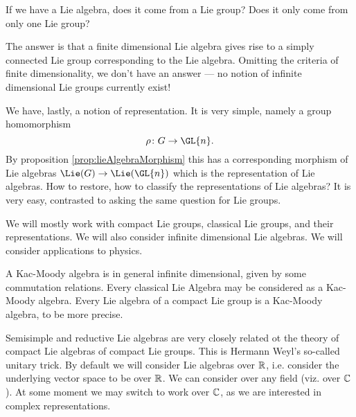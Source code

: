 \begin{quest}
If we have a Lie algebra, does it come from a Lie group? Does it
only come from only one Lie group?
\end{quest}
The answer is that a finite dimensional Lie algebra gives rise to
a simply connected Lie group corresponding to the Lie
algebra. Omitting the criteria of finite dimensionality, we don't
have an answer --- no notion of infinite dimensional Lie groups
currently exist!

We have, lastly, a notion of representation. It is very simple,
namely a group homomorphism
\begin{equation}
\rho\colon G\to\GL{n}.
\end{equation}
By proposition \ref{prop:lieAlgebraMorphism} this has a
corresponding  morphism of Lie algebras $\Lie(G)\to\Lie(\GL{n})$
which is the representation of Lie algebras. How to restore, how
to classify the representations of Lie algebras? It is very easy,
contrasted to asking the same question for Lie groups.

We will mostly work with compact Lie groups, classical Lie
groups, and their representations. We will also consider infinite
dimensional Lie algebras. We will consider applications to
physics.

A Kac-Moody algebra is in general infinite dimensional, given by
some commutation relations. Every classical Lie Algebra may be
considered as a Kac-Moody algebra. Every Lie algebra of a compact
Lie group is a Kac-Moody algebra, to be more precise.

Semisimple and reductive Lie algebras are very closely related ot
the theory of compact Lie algebras of compact Lie groups. This is
Hermann Weyl's so-called unitary trick. By default we will
consider Lie algebras over $\Bbb{R}$, i.e. consider the
underlying vector space to be over $\Bbb{R}$. We can consider
over any field (viz. over $\Bbb{C}$). At some moment we may
switch to work over $\Bbb{C}$, as we are interested in complex
representations.
